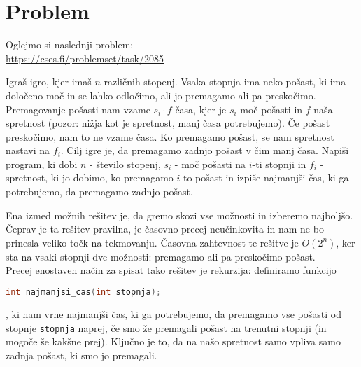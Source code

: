 \section{Problem}\label{sec:problem}
Oglejmo si naslednji problem:\\
\url{https://cses.fi/problemset/task/2085}
\begin{definition}
    Igraš igro, kjer imaš $n$ različnih stopenj.
    Vsaka stopnja ima neko pošast, ki ima določeno moč in se lahko odločimo, ali jo premagamo ali pa preskočimo.
    Premagovanje pošasti nam vzame $s_i \cdot f$ časa, kjer je $s_i$ moč pošasti in $f$ naša spretnost (pozor: nižja kot je spretnost, manj časa potrebujemo).
    Če pošast preskočimo, nam to ne vzame časa.
    Ko premagamo pošast, se nam spretnost nastavi na $f_i$.
    Cilj igre je, da premagamo zadnjo pošast v čim manj časa.
    Napiši program, ki dobi $n$ - število stopenj, $s_i$ - moč pošasti na $i$-ti stopnji in $f_i$ - spretnost, ki jo dobimo, ko premagamo $i$-to pošast in izpiše najmanjši čas, ki ga potrebujemo, da premagamo zadnjo pošast.
\end{definition}
Ena izmed možnih rešitev je, da gremo skozi vse možnosti in izberemo najboljšo.
Čeprav je ta rešitev pravilna, je časovno precej neučinkovita in nam ne bo prinesla veliko točk na tekmovanju.
Časovna zahtevnost te rešitve je $O(2^n)$, ker sta na vsaki stopnji dve možnosti: premagamo ali pa preskočimo pošast.\\
Precej enostaven način za spisat tako rešitev je rekurzija: definiramo funkcijo
\begin{lstlisting}[label={lst:code1}, language=C++]
int najmanjsi_cas(int stopnja);
\end{lstlisting}
, ki nam vrne najmanjši čas, ki ga potrebujemo, da premagamo vse pošasti od stopnje \texttt{stopnja} naprej, če smo že premagali pošast na trenutni stopnji (in mogoče še kakšne prej).
Ključno je to, da na našo spretnost samo vpliva samo zadnja pošast, ki smo jo premagali.

